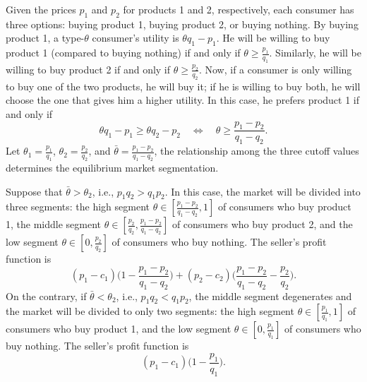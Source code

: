 \documentclass[11pt,a4paper]{article}
\begin{document}
Given the prices $p_1$ and $p_2$ for products 1 and 2, respectively, 
each consumer has three options: buying product 1, buying product 2, 
or buying nothing. By buying product 1, a type-$\theta$ consumer's utility 
is $\theta q_1 - p_1$. He will be willing to buy product 1 (compared to 
buying nothing) if and only if $\theta \geq \frac{p_1}{q_1}$. 
Similarly, he will be willing to buy product 2 if and only if 
$\theta \geq \frac{p_2}{q_2}$. Now, if a consumer is only willing to buy
one of the two products, he will buy it; if he is willing to buy both, 
he will choose the one that gives him a higher utility. 
In this case, he prefers product 1 if and only if 
\[
	\theta q_1 - p_1 \geq \theta q_2 - p_2 \quad\Leftrightarrow\quad
	\theta \geq \frac{p_1 - p_2}{q_1 - q_2}. 
\]
Let $\theta_1 = \frac{p_1}{q_1}$, $\theta_2 = \frac{p_2}{q_2}$, 
and $\bar{\theta} = \frac{p_1 - p_2}{q_1 - q_2}$, the relationship
among the three cutoff values determines the equilibrium market segmentation. 

Suppose that $\bar{\theta} > \theta_2$, i.e., $p_1q_2 > q_1p_2$. 
In this case, the market will be divided into three segments: 
the high segment $\theta \in [\frac{p_1 - p_2}{q_1 - q_2}, 1]$ of consumers
who buy product 1, 
the middle segment $\theta \in [\frac{p_2}{q_2}, \frac{p_1 - p_2}{q_1 - q_2}]$
of consumers who buy product 2, and 
the low segment $\theta \in [0, \frac{p_2}{q_2}]$ of consumers who buy nothing. 
The seller's profit function is 
\[
	(p_1 - c_1)\bigg(1 - \frac{p_1 - p_2}{q_1 - q_2}\bigg)
	+ (p_2 - c_2)\bigg(\frac{p_1 - p_2}{q_1 - q_2} - \frac{p_2}{q_2}\bigg).
\]
On the contrary, if $\bar{\theta} < \theta_2$, i.e., $p_1q_2 < q_1p_2$,  
the middle segment degenerates and the market will be divided to only two segments: 
the high segment $\theta \in [\frac{p_1}{q_1}, 1]$ of consumers
who buy product 1, and 
the low segment $\theta \in [0, \frac{p_1}{q_1}]$ of consumers who buy nothing. 
The seller's profit function is 
\[
	(p_1 - c_1)\bigg(1 - \frac{p_1}{q_1}\bigg). 
\]
\end{document}
